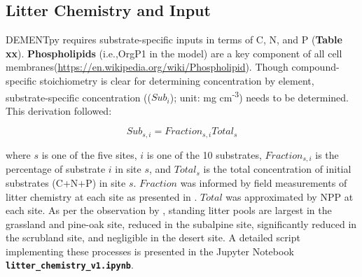 \documentclass[letterpaper, 10pt]{article}
\begin{document}
\subsection{\large Litter Chemistry and Input}
DEMENTpy requires substrate-specific inputs in terms of C, N, and P (\textbf{Table xx}). \textbf{Phospholipids} (i.e.,OrgP1 in the model) are a key component of all cell membranes(\url{https://en.wikipedia.org/wiki/Phospholipid}). Though compound-specific stoichiometry is clear for determining concentration by element, substrate-specific concentration (($Sub_i$); unit: mg cm\textsuperscript{-3}) needs to be determined. This derivation followed:

\begin{equation}
  Sub_{s,i} = Fraction_{s,i} Total_s 
\end{equation}

where $s$ is one of the five sites, $i$ is one of the 10 substrates, $Fraction_{s,i}$ is the percentage of substrate $i$ in site $s$, and $Total_s$ is the total concentration of initial substrates (C+N+P) in site $s$.  $Fraction$ was informed by field measurements of litter chemistry at each site as presented in \citet{baker2017extracellular}. $Total$ was approximated by NPP at each site. As per the observation by \citet{baker2017extracellular}, standing litter pools are largest in the grassland and pine-oak site, reduced in the subalpine site, significantly reduced in the scrubland site, and negligible in the desert site. A detailed script implementing these processes is presented in the Jupyter Notebook \textbf{\texttt{litter\_chemistry\_v1.ipynb}}.




\end{document}
